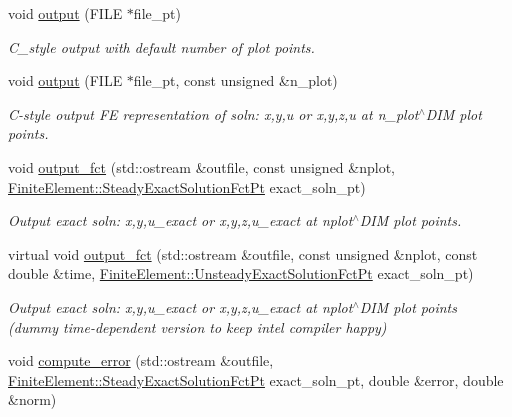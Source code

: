 \begin{DoxyCompactItemize}
void \hyperlink{classoomph_1_1AdvectionDiffusionReactionEquations_abb205e32ac157870312dd5d1180233b1}{output} (F\+I\+LE $\ast$file\+\_\+pt)
\begin{DoxyCompactList}\small\item\em C\+\_\+style output with default number of plot points. \end{DoxyCompactList}\item 
void \hyperlink{classoomph_1_1AdvectionDiffusionReactionEquations_a1ada1e57cac4bff9ecf73520a907b7c8}{output} (F\+I\+LE $\ast$file\+\_\+pt, const unsigned \&n\+\_\+plot)
\begin{DoxyCompactList}\small\item\em C-\/style output FE representation of soln\+: x,y,u or x,y,z,u at n\+\_\+plot$^\wedge$\+D\+IM plot points. \end{DoxyCompactList}\item 
void \hyperlink{classoomph_1_1AdvectionDiffusionReactionEquations_af540c03c411843c566c81af918d620c2}{output\+\_\+fct} (std\+::ostream \&outfile, const unsigned \&nplot, \hyperlink{classoomph_1_1FiniteElement_a690fd33af26cc3e84f39bba6d5a85202}{Finite\+Element\+::\+Steady\+Exact\+Solution\+Fct\+Pt} exact\+\_\+soln\+\_\+pt)
\begin{DoxyCompactList}\small\item\em Output exact soln\+: x,y,u\+\_\+exact or x,y,z,u\+\_\+exact at nplot$^\wedge$\+D\+IM plot points. \end{DoxyCompactList}\item 
virtual void \hyperlink{classoomph_1_1AdvectionDiffusionReactionEquations_abfb9e33a5575df7f36cdee7e44b3d282}{output\+\_\+fct} (std\+::ostream \&outfile, const unsigned \&nplot, const double \&time, \hyperlink{classoomph_1_1FiniteElement_ad4ecf2b61b158a4b4d351a60d23c633e}{Finite\+Element\+::\+Unsteady\+Exact\+Solution\+Fct\+Pt} exact\+\_\+soln\+\_\+pt)
\begin{DoxyCompactList}\small\item\em Output exact soln\+: x,y,u\+\_\+exact or x,y,z,u\+\_\+exact at nplot$^\wedge$\+D\+IM plot points (dummy time-\/dependent version to keep intel compiler happy) \end{DoxyCompactList}\item 
void \hyperlink{classoomph_1_1AdvectionDiffusionReactionEquations_a19c48ef418ac58dede7b397971fa7379}{compute\+\_\+error} (std\+::ostream \&outfile, \hyperlink{classoomph_1_1FiniteElement_a690fd33af26cc3e84f39bba6d5a85202}{Finite\+Element\+::\+Steady\+Exact\+Solution\+Fct\+Pt} exact\+\_\+soln\+\_\+pt, double \&error, double \&norm)

\end{DoxyCompactItemize}

